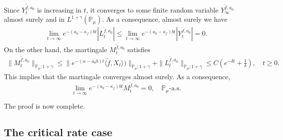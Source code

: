 \documentclass[12pt,a4paper]{amsart}
\theoremstyle{plain}
\theoremstyle{definition}
\numberwithin{equation}{section}
\begin{document}
    Since $Y_t^{\tilde{f},a_0}$ is increasing in $t$, it converges to some finite random variable $Y_{\infty}^{\tilde{f},a_0}$ almost surely and in $L^{1+\gamma}(\mathbb{P}_{\mu})$.
	As a consequence, almost surely we have
\begin{align*}
    \lim_{t\rightarrow \infty}e^{-(a_0 - \kappa_f)bt}|L_t^{\tilde{f},a_0}|
    \leq  \lim_{t\rightarrow \infty}e^{-(a_0 - \kappa_f)bt}|Y_t^{\tilde{f},a_0}|=0.
\end{align*}
	On the other hand, the martingale $M_t^{\tilde{f},a_0}$ satisfies
\begin{align*}
    \|M_t^{\tilde{f},a_0}\|_{\mathbb{P}_{\mu};1+\gamma}
    \leq  \|e^{-(\alpha-a_0 b)t}\langle \tilde{f},X_t\rangle)\|_{\mathbb{P}_{\mu};1+\gamma}+\|L_t^{\tilde{f},a_0}\|_{\mathbb{P}_{\mu};1+\gamma}\leq C(e^{-\delta t}+\frac{1}{\delta}),
    \quad t\geq 0.
\end{align*}
	This implies that the martingale converges almost surely.
	As a consequence,
\[
	\lim_{t\rightarrow\infty} e^{-(a_0-\kappa_f)bt}M_t^{\tilde{f},a_0}
	=0,
	\quad \mathbb P_\mu\text{-a.s.}
\]
	
	The proof is now complete.

\subsection{The critical rate case}
\end{document}
